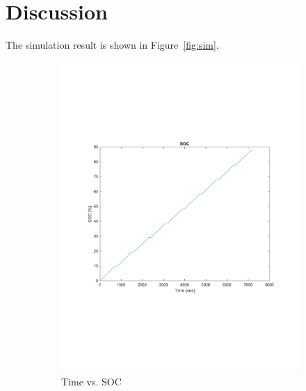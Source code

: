 \documentclass[10pt]{article}
\begin{document}
\section{Discussion}
The simulation result is shown in Figure~\ref{fig:sim}.
\begin{figure}[H]
	\centering
	\begin{subfigure}[t]{0.36\textwidth}
		\includegraphics[width=\textwidth]{SOC.pdf}
		\caption{Time vs. SOC}
		\label{fig:SOC}
	\end{subfigure}
	\begin{subfigure}[t]{0.36\textwidth}

\end{subfigure}
\end{figure}
\end{document}
